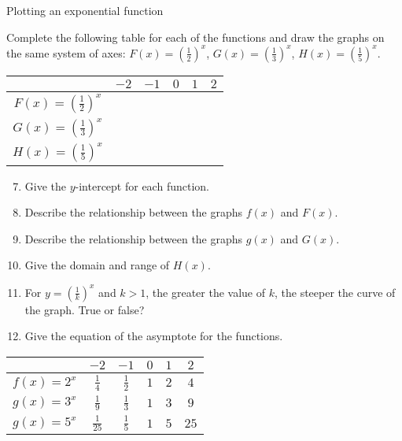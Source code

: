 \begin{wex}{Plotting an exponential function}
{Complete the following table for each of the functions and draw the graphs on the same system of axes:
$F(x) =(\frac{1}{2})^{x}$, $G(x) =(\frac{1}{3})^{x}$, $H(x) =(\frac{1}{5})^{x}$.
\begin{table}[H]
\begin{center}
\begin{tabular}{|c|c|c|c|c|c|}
\hline
   &  $-2$ & $-1$ & $0$ & $1$ & $2$ 
\\ \hline
$F(x)=(\frac{1}{2})^{x}$&  \hspace{1cm}  & \hspace{1cm} & \hspace{1cm} & \hspace{1cm} & \hspace{1cm} 
\\ \hline
$G(x)=(\frac{1}{3})^{x}$&  &&&&
\\ \hline
$H(x)=(\frac{1}{5})^{x}$&  &&&&
\\ \hline

\end{tabular}
\end{center}
\end{table}

\begin{enumerate}[noitemsep, label=\textbf{\arabic*}. ] 
\setcounter{enumi}{6}
 \item Give the $y$-intercept for each function.
\item Describe the relationship between the graphs $f(x)$ and $F(x)$.
\item Describe the relationship between the graphs $g(x)$ and $G(x)$.
\item Give the domain and range of $H(x)$.
\item For $y=(\frac{1}{k})^{x}$ and $k>1$, the greater the value of $k$, the steeper the curve of the graph. True or false?
\item Give the equation of the asymptote for the functions.
\end{enumerate}
}
{
\begin{table}[H]
\begin{center}
\begin{tabular}{|c|c|c|c|c|c|}
\hline
   &  $-2$ & $-1$ & $0$ & $1$ & $2$ 
\\ \hline
 $f(x)=2^{x}$& $\frac{1}{4}$ &$\frac{1}{2}$&$1$&$2$&$4$
\\ \hline
 $g(x)=3^{x}$& $\frac{1}{9}$ &$\frac{1}{3}$&$1$&$3$&$9$
\\ \hline
 $g(x)=5^{x}$& $\frac{1}{25}$ &$\frac{1}{5}$&$1$&$5$&$25$
\\ \hline


\end{tabular}
\end{center}
\end{table}}
\end{wex}
